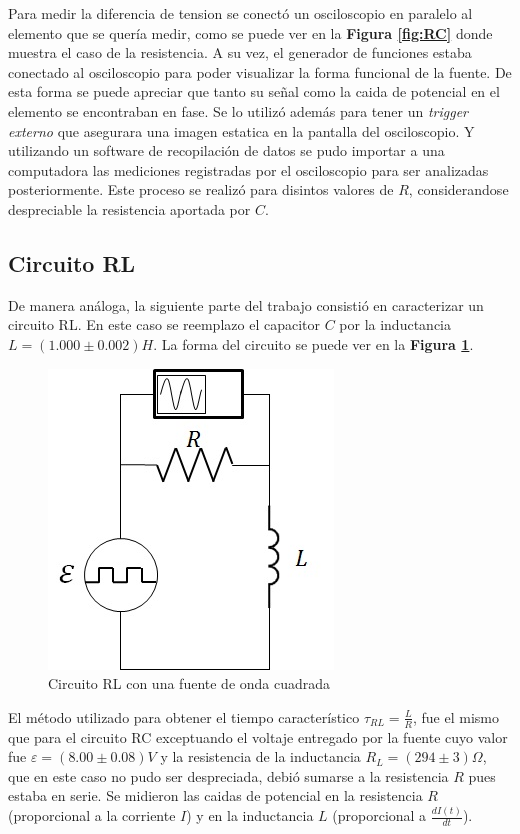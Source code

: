 \documentclass[11pt,a4paper]{article}
\begin{document}
Para medir la diferencia de tension se conectó un osciloscopio en paralelo al elemento que se quería medir, como se puede ver en la \textbf{Figura \ref{fig:RC}} donde muestra el caso de la resistencia. A su vez, el generador de funciones estaba conectado al osciloscopio para poder visualizar la forma funcional de la fuente. De esta forma se puede apreciar que tanto su señal como la caida de potencial en el elemento se encontraban en fase. Se lo utilizó además para tener un \textit{trigger externo} que asegurara una imagen estatica en la pantalla del osciloscopio. Y utilizando un software de recopilación de datos se pudo importar a una computadora las mediciones registradas por el osciloscopio para ser analizadas posteriormente. Este proceso se realizó para disintos valores de $R$, considerandose despreciable la resistencia aportada por $C$.

\subsection{Circuito RL}

De manera análoga, la siguiente parte del trabajo consistió en caracterizar un circuito RL. En este caso se reemplazo el capacitor $C$ por la inductancia $L = (1.000 \pm 0.002) H$. La forma del circuito se puede ver en la \textbf{Figura \ref{fig:RL}}.

\begin{figure}[h]
\centering
\includegraphics[scale=0.7]{Circuito-RL}
  \caption{Circuito RL con una fuente de onda cuadrada}
  \label{fig:RL}
\end{figure}

El método utilizado para obtener el tiempo característico $\tau_{RL} = \frac{L}{R}$, fue el mismo que para el circuito RC exceptuando el voltaje entregado por la fuente cuyo valor fue $\varepsilon = (8.00 \pm 0.08)V$ y la resistencia de la inductancia $R_L = (294 \pm 3) \Omega$, que en este caso no pudo ser despreciada, debió sumarse a la resistencia $R$ pues estaba en serie. Se midieron las caidas de potencial en la resistencia $R$ (proporcional a la corriente $I$) y en la inductancia $L$ (proporcional a $\frac{dI(t)}{dt}$).
\end{document}
